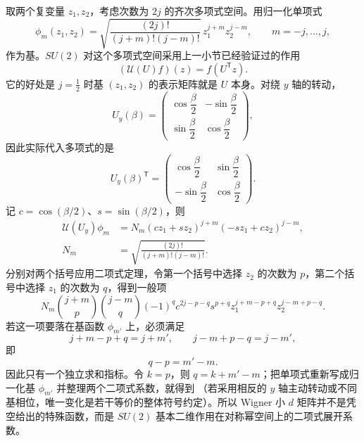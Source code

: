 取两个复变量 $z_1,z_2$，考虑次数为 $2j$ 的齐次多项式空间。用归一化单项式
\[
\phi_m(z_1,z_2)
=
\sqrt{\frac{(2j)!}{(j+m)!(j-m)!}}
\,z_1^{j+m}z_2^{j-m},
\qquad m=-j,\dots,j,
\]
作为基。$SU(2)$ 对这个多项式空间采用上一小节已经验证过的作用
\[
(\mathcal U(U)f)(z)=f(U^{\mathsf T}z).
\]
它的好处是 $j=\tfrac12$ 时基 $(z_1,z_2)$ 的表示矩阵就是 $U$ 本身。对绕 $y$ 轴的转动，
\[
U_y(\beta)=
\begin{pmatrix}
\cos\dfrac\beta2&-\sin\dfrac\beta2\\
\sin\dfrac\beta2&\cos\dfrac\beta2
\end{pmatrix},
\]
因此实际代入多项式的是
\[
U_y(\beta)^{\mathsf T}
=
\begin{pmatrix}
\cos\dfrac\beta2&\sin\dfrac\beta2\\
-\sin\dfrac\beta2&\cos\dfrac\beta2
\end{pmatrix}.
\]
记 $c=\cos(\beta/2)$、$s=\sin(\beta/2)$，则
\begin{align*}
\mathcal U(U_y)\phi_m
&=N_m(cz_1+sz_2)^{j+m}(-sz_1+cz_2)^{j-m},\\
N_m&=\sqrt{\frac{(2j)!}{(j+m)!(j-m)!}}.
\end{align*}
分别对两个括号应用二项式定理，令第一个括号中选择 $z_2$ 的次数为 $p$，第二个括号中选择 $z_1$ 的次数为 $q$，得到一般项
\[
N_m
\binom{j+m}{p}\binom{j-m}{q}
(-1)^q
c^{2j-p-q}s^{p+q}
 z_1^{j+m-p+q}z_2^{j-m+p-q}.
\]
若这一项要落在基函数 $\phi_{m'}$ 上，必须满足
\[
j+m-p+q=j+m',
\qquad
j-m+p-q=j-m',
\]
即
\[
q-p=m'-m.
\]
因此只有一个独立求和指标。令 $k=p$，则 $q=k+m'-m$；把单项式重新写成归一化基 $\phi_{m'}$ 并整理两个二项式系数，就得到 （若采用相反的 $y$ 轴主动转动或不同基相位，唯一变化是若干等价的整体符号约定）。所以 Wigner 小 $d$ 矩阵并不是凭空给出的特殊函数，而是 $SU(2)$ 基本二维作用在对称幂空间上的二项式展开系数。

